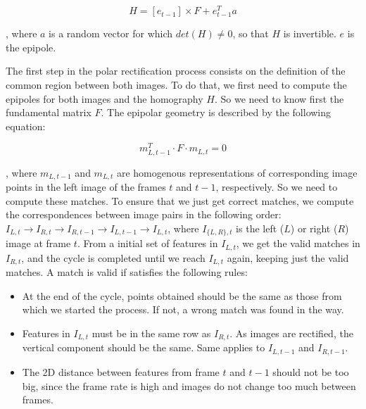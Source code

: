 \begin{equation}\label{eq:cp04_homography}
H = [e_{t - 1}] \times F + e_{t - 1}^T a
\end{equation}

, where $a$ is a random vector for which $det(H) \neq 0$, so that $H$ is invertible. $e$ is the epipole.

The first step in the polar rectification process consists on the definition of the common region between both images. To do that, we first need to compute the epipoles for both images and the homography $H$. So we need to know first the fundamental matrix $F$. The epipolar geometry is described by the following equation:

\begin{equation}\label{eq:cp04_fundamental_matrix}
m_{L,t - 1}^T \cdot F \cdot m_{L,t}= 0
\end{equation}

, where $m_{L,t - 1}$ and $m_{L,t}$ are homogenous representations of corresponding image points in the left image of the frames $t$ and $t - 1$, respectively. So we need to compute these matches. To ensure that we just get correct matches, we compute the correspondences between image pairs in the following order: $I_{L, t} \rightarrow I_{R, t} \rightarrow I_{R, t - 1} \rightarrow I_{L, t - 1} \rightarrow I_{L, t}$, where $I_{\{L,R\},t}$ is the left ($L$) or right ($R$) image at frame $t$. From a initial set of features in $I_{L, t}$, we get the valid matches in $I_{R, t}$, and the cycle is completed until we reach $I_{L, t}$ again, keeping just the valid matches. A match is valid if satisfies the following rules:
\begin{itemize}
 \item At the end of the cycle, points obtained should be the same as those from which we started the process. If not, a wrong match was found in the way.
 \item Features in $I_{L, t}$ must be in the same row as $I_{R, t}$. As images are rectified, the vertical component should be the same. Same applies to $I_{L, t - 1}$ and $I_{R, t - 1}$.
 \item The 2D distance between features from frame $t$ and $t - 1$ should not be too big, since the frame rate is high and images do not change too much between frames.
\end{itemize}

